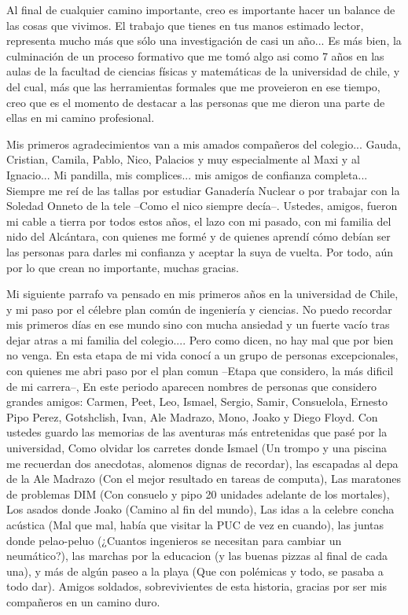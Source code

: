 \begin{thanks} %
Al final de cualquier camino importante, creo es importante hacer un balance de las cosas que vivimos. El trabajo que tienes en tus manos estimado lector, representa mucho más que sólo una investigación de casi un año... Es más bien, la culminación de un proceso formativo que me tomó algo asi como 7 años en las aulas de la facultad de ciencias físicas y matemáticas de la universidad de chile, y del cual, más que las herramientas formales que me proveieron en ese tiempo, creo que es el momento de destacar a las personas que me dieron una parte de ellas en mi camino profesional.

Mis primeros agradecimientos van a mis amados compañeros del colegio... Gauda, Cristian, Camila, Pablo, Nico, Palacios y muy especialmente al Maxi y al Ignacio... Mi pandilla, mis complices... mis amigos de confianza completa... Siempre me reí de las tallas por estudiar Ganadería Nuclear o por trabajar con la Soledad Onneto de la tele --Como el nico siempre decía--. Ustedes, amigos, fueron mi cable a tierra por todos estos años, el lazo con mi pasado, con mi familia del nido del Alcántara, con quienes me formé y de quienes aprendí cómo debían ser las personas para darles mi confianza y aceptar la suya de vuelta. Por todo, aún por lo que crean no importante, muchas gracias.

Mi siguiente parrafo va pensado en mis primeros años en la universidad de Chile, y mi paso por el célebre plan común de ingeniería y ciencias. No puedo recordar mis primeros días en ese mundo sino con mucha ansiedad y un fuerte vacío tras dejar atras a mi familia del colegio.... Pero como dicen, no hay mal que por bien no venga. En esta etapa de mi vida conocí a un grupo de personas excepcionales, con quienes me abri paso por el plan comun --Etapa que considero, la más dificil de mi carrera--, En este periodo aparecen nombres de personas que considero grandes amigos: Carmen, Peet, Leo, Ismael, Sergio, Samir, Consuelola, Ernesto Pipo Perez, Gotshclish, Ivan, Ale Madrazo, Mono, Joako y Diego Floyd. Con ustedes guardo las memorias de las aventuras más entretenidas que pasé por la universidad, Como olvidar los carretes donde Ismael (Un trompo y una piscina me recuerdan dos anecdotas, alomenos dignas de recordar), las escapadas al depa de la Ale Madrazo (Con el mejor resultado en tareas de computa), Las maratones de problemas DIM (Con consuelo y pipo 20 unidades adelante de los mortales), Los asados donde Joako (Camino al fin del mundo), Las idas a la celebre concha acústica (Mal que mal, había que visitar la PUC de vez en cuando), las juntas donde pelao-peluo (¿Cuantos ingenieros se necesitan para cambiar un neumático?), las marchas por la educacion (y las buenas pizzas al final de cada una), y más de algún paseo a la playa (Que con polémicas y todo, se pasaba a todo dar). Amigos soldados, sobrevivientes de esta historia, gracias por ser mis compañeros en un camino duro.


\end{thanks}